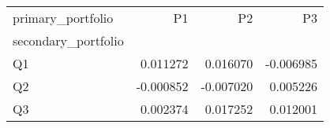 \begin{tabular}{lrrr}
\toprule
primary_portfolio & P1 & P2 & P3 \\
secondary_portfolio &  &  &  \\
\midrule
Q1 & 0.011272 & 0.016070 & -0.006985 \\
Q2 & -0.000852 & -0.007020 & 0.005226 \\
Q3 & 0.002374 & 0.017252 & 0.012001 \\
\bottomrule
\end{tabular}
